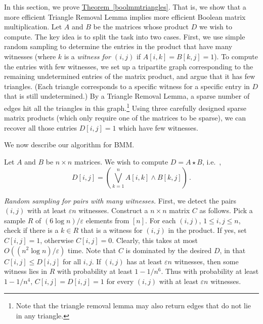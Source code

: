 \documentclass[10pt]{article}
\theoremstyle{definition}
\providecommand{\ie}{i.e.\ }
\numberwithin{equation}{section}
\newcommand{\expref}[2]{\texorpdfstring{\hyperref[#2]{#1~\ref{#2}}}{#1~\ref{#2}}}
\newcommand{\eps}{\varepsilon}
\begin{document}
In this section, we prove \expref{Theorem}{boolmmtriangles}.
That is, we show that a more efficient Triangle Removal Lemma implies more efficient Boolean matrix multiplication.
Let $A$ and $B$ be the matrices whose product $D$ we wish to compute. The key idea is to split the task into two cases. First, we use simple random sampling to determine the entries in the product that have many witnesses (where $k$ is a \emph{witness for $(i,j)$} if $A[i,k]=B[k,j]=1$). To compute the entries with few witnesses, we set up a tripartite graph corresponding to the remaining undetermined entries of the matrix product, and argue that it has few triangles. (Each triangle corresponds to a specific witness for a specific entry in $D$ that is still undetermined.) By a Triangle Removal Lemma, a sparse number of edges hit all the triangles in this graph.\footnote{Note that the triangle removal lemma may also return edges that do not lie in any triangle.} Using three carefully designed sparse matrix products (which only require one of the matrices to be sparse), we can recover all those entries $D[i,j]=1$ which have few witnesses.

We now describe our algorithm for BMM.

\smallskip

 Let $A$ and $B$ be $n \times n$ matrices. We wish to compute $D = A \star B$, \ie,
\[
D[i,j] = \left(\bigvee_{k=1}^n A[i,k] \wedge B[k,j]\right)\,.
\] 

\smallskip

\noindent
\emph{Random sampling for pairs with many witnesses.}
First, we detect the pairs $(i,j)$ with at least $\eps n$ witnesses.
Construct a $n\times n$ matrix $C$  as follows. Pick a sample $R$ of $(6\log n)/\eps$ elements from $[n]$.
For each $(i,j)$,  $1 \leq i,j \leq n$, check if there is a $k \in R$ that is a witness for $(i,j)$ in the product. If yes, set $C[i,j]=1$, otherwise $C[i,j]=0$. Clearly, this takes at most $O((n^2 \log n) /\eps)$ time. Note that  $C$ is dominated by the desired $D$, in that $C[i,j] \leq D[i,j]$ for all $i,j$.
If $(i,j)$ has at least $\eps n$ witnesses, then some witness lies in $R$ with probability at least $1-1/n^6$. Thus with probability at least $1-1/n^4$, $C[i,j]=D[i,j]=1$ for every $(i,j)$ with at least $\eps n$ witnesses.

\smallskip
\end{document}
